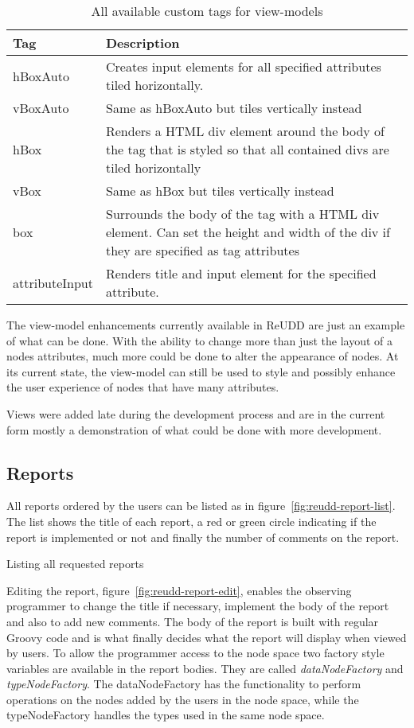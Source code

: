 \documentclass[a4paper]{report}
\begin{document}
\begin{table}[hbtp]
	\center
	\begin{tabular}{|l|p{7cm}|}
		\hline
		\textbf{Tag}	& \textbf{Description} \\ \hline
		hBoxAuto		& Creates input elements for all specified attributes tiled horizontally. \\ \hline
		vBoxAuto		& Same as hBoxAuto but tiles vertically instead \\ \hline
		hBox			& Renders a HTML div element around the body of the tag that is styled so that all contained divs are tiled horizontally \\ \hline
		vBox			& Same as hBox but tiles vertically instead \\ \hline
		box				& Surrounds the body of the tag with a HTML div element. Can set the height and width of the div if they are specified as tag attributes \\ \hline
		attributeInput	& Renders title and input element for the specified attribute. \\ \hline
	\end{tabular}
	\caption{All available custom tags for view-models}
	\label{tab:reudd-view-tags}
\end{table}

The view-model enhancements currently available in ReUDD are just an example of what can be done. With the ability to change more than just the layout of a nodes attributes, much more could be done to alter the appearance of nodes. At its current state, the view-model can still be used to style and possibly enhance the user experience of nodes that have many attributes.

Views were added late during the development process and are in the current form mostly a demonstration of what could be done with more development.

\subsection{Reports} \label{sec:reports-improvements}
All reports ordered by the users can be listed as in figure~\ref{fig:reudd-report-list}. The list shows the title of each report, a red or green circle indicating if the report is implemented or not and finally the number of comments on the report.

	{Listing all requested reports}

Editing the report, figure~\ref{fig:reudd-report-edit}, enables the observing programmer to change the title if necessary, implement the body of the report and also to add new comments. The body of the report is built with regular Groovy code and is what finally decides what the report will display when viewed by users. To allow the programmer access to the node space two factory style variables are available in the report bodies. They are called \emph{dataNodeFactory} and \emph{typeNodeFactory}. The dataNodeFactory has the functionality to perform operations on the nodes added by the users in the node space, while the typeNodeFactory handles the types used in the same node space.
	
\end{document}
